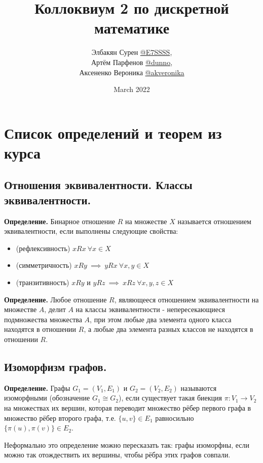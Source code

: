 \documentclass[a4paper, 10pt]{article}
\title{Коллоквиум 2 по дискретной математике}
\author{Элбакян Сурен  \href{https://t.me/E7SSSS}{@E7SSSS}, \\ Артём Парфенов \href{https://t.me/dunno_0}{@dunno}, \\ Аксененко Вероника \href{https://t.me/akveronika}{@akveronika}}
\date{March 2022}
\begin{document}
\maketitle

\tableofcontents

\newpage

\section{Список определений и теорем из курса}

\subsection{Отношения эквивалентности. Классы эквивалентности.}

\textbf{Определение.} Бинарное отношение $R$ на множестве $X$ называется отношением эквивалентности, если выполнены следующие свойства:

\begin{itemize}
    \item (рефлексивность) $x R x \ \forall x \in X$
    \item (симметричность) $x R y \ \implies \ y R x \ \forall x,y \in X$
    \item (транзитивность) $x R y$ и $y R z \ \implies \ x R z \ \forall x, y, z \in X$
\end{itemize}

\textbf{Определение.} Любое отношение $R$, являющееся отношением эквивалентности на множестве $A$, делит $A$ на классы эквивалентности - непересекающиеся подмножества множества $A$, при этом любые два элемента одного класса находятся в отношении $R$, а любые два элемента разных классов не находятся в отношении $R$.

\subsection{Изоморфизм графов.}

\textbf{Определение.} Графы $G_1 = (V_1, E_1)$ и $G_2 = (V_2, E_2)$ называются изоморфными (обозначение $G_1 \cong G_2$), если существует такая биекция $\pi: V_1 \to V_2$ на множествах их вершин, которая переводит множество рёбер первого графа в множество рёбер второго графа, т.е. $\{u, v\} \in E_1$ равносильно $\{\pi(u), \pi(v)\} \in E_2$.

Неформально это определение можно пересказать так: графы изоморфны, если можно так отождествить их вершины, чтобы рёбра этих графов совпали.
\end{document}
